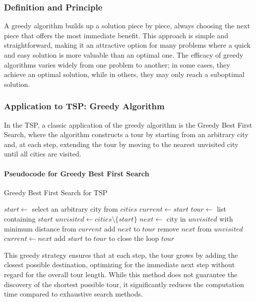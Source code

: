 \subsubsection{Definition and Principle}

A greedy algorithm builds up a solution piece by piece, always choosing the next piece that offers the most immediate benefit. This approach is simple and straightforward, making it an attractive option for many problems where a quick and easy solution is more valuable than an optimal one. The efficacy of greedy algorithms varies widely from one problem to another; in some cases, they achieve an optimal solution, while in others, they may only reach a suboptimal solution.

\subsubsection{Application to TSP: Greedy Algorithm}

In the TSP, a classic application of the greedy algorithm is the Greedy Best First Search, where the algorithm constructs a tour by starting from an arbitrary city and, at each step, extending the tour by moving to the nearest unvisited city until all cities are visited.

\paragraph{Pseudocode for Greedy Best First Search}

\begin{algorithm}
	\caption{Greedy Best First Search for TSP}\label{alg:greedybestfirst}
	\begin{algorithmic}[1]
		\State $start \gets$ select an arbitrary city from $cities$
		\State $current \gets start$
		\State $tour \gets$ list containing $start$
		\State $unvisited \gets cities \setminus \{start\}$
		\State $next \gets$ city in $unvisited$ with minimum distance from $current$
		\State add $next$ to $tour$
		\State remove $next$ from $unvisited$
		\State $current \gets next$
		\EndWhile
		\State add $start$ to $tour$ to close the loop
		\State \Return $tour$
		\EndProcedure
	\end{algorithmic}
\end{algorithm}

This greedy strategy ensures that at each step, the tour grows by adding the closest possible destination, optimizing for the immediate next step without regard for the overall tour length. While this method does not guarantee the discovery of the shortest possible tour, it significantly reduces the computation time compared to exhaustive search methods.

